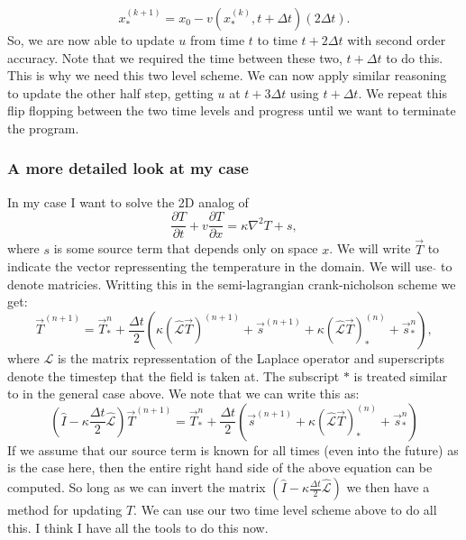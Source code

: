 \documentclass{article}
\begin{document}
\begin{equation}
	x_{*}^{(k+1)} = x_0 - v(x_{*}^{(k)}, t + \Delta t) (2 \Delta t).
\end{equation}
So, we are now able to update $u$ from time $t$ to time $t+2\Delta t$ with second order accuracy. Note that we required the time between these two, $t + \Delta t$ to do this. This is why we need this two level scheme. We can now apply similar reasoning to update the other half step, getting $u$ at $t+3 \Delta t$ using $t+ \Delta t$. We repeat this flip flopping between the two time levels and progress until we want to terminate the program.
\newline

\subsubsection*{A more detailed look at my case}
In my case I want to solve the 2D analog of
\begin{equation}
	\frac{\partial T}{\partial t} + v \frac{\partial T}{\partial x} = \kappa \nabla^2 T + s,
\end{equation}
where $s$ is some source term that depends only on space $x$.
\newline
We will write $\vec{T}$ to indicate the vector repressenting the temperature in the domain. We will use $\hat{}$ to denote matricies. Writting this in the semi-lagrangian crank-nicholson scheme we get:
\begin{equation}
	\vec{T}^{(n+1)} = \vec{T}^{n}_{*} + \frac{\Delta t}{2} ( \kappa (\hat{\mathcal{L}} \vec{T})^{(n+1)} + \vec{s}^{(n+1)} +  \kappa (\hat{\mathcal{L}} \vec{T})_{*}^{(n)} + \vec{s}^{n}_{*}),
\end{equation}
where $\mathcal{L}$ is the matrix repressentation of the Laplace operator and superscripts denote the timestep that the field is taken at. The subscript ${*}$ is treated similar to in the general case above. 
We note that we can write this as:
\begin{equation}
	(\hat{I} - \kappa \frac{\Delta t}{2} \hat{\mathcal{L}}) \vec{T}^{(n+1)} = \vec{T}^{n}_{*} + \frac{\Delta t}{2} (\vec{s}^{(n+1)} +  \kappa (\hat{\mathcal{L}} \vec{T})_{*}^{(n)} + \vec{s}^{n}_{*})
\end{equation}
If we assume that our source term is known for all times (even into the future) as is the case here,  then the entire right hand side of the above equation can be computed. So long as we can invert the matrix $(\hat{I} - \kappa \frac{\Delta t}{2} \hat{\mathcal{L}})$ we then have a method for updating $T$. We can use our two time level scheme above to do all this. I think I have all the tools to do this now.
\end{document}
